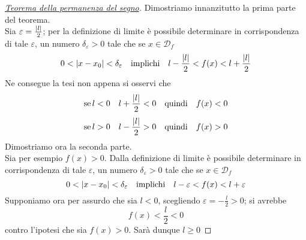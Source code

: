 \begin{proof}[\protect\hyperlink{teor:segno}{Teorema della permanenza del segno}]
  Dimostriamo innanzitutto la prima parte del teorema.\\
  Sia $\varepsilon=\frac{\lvert l\rvert}{2}$; per la definizione di limite è possibile determinare in 
  corrispondenza di tale $\varepsilon$, un numero $\delta_\varepsilon>0$ tale che se 
  $x\in\mathscr{D}_f$
  \begin{equation*}
    0<\lvert x-x_0\rvert<\delta_\varepsilon\quad\text{implichi}\quad
    l-\frac{\lvert l\rvert}{2}<f(x)<l+\frac{\lvert l\rvert}{2}
  \end{equation*}
  Ne consegue la tesi non appena si osservi che
  \begin{equation*}
    \text{se}\, l<0\quad l+\frac{\lvert l\rvert}{2}<0\quad\text{quindi}\quad f(x)<0
  \end{equation*}
  \begin{equation*}
    \text{se}\, l>0\quad l-\frac{\lvert l\rvert}{2}>0\quad\text{quindi}\quad f(x)>0
  \end{equation*}
  Dimostriamo ora la seconda parte.\\
  Sia per esempio $f(x)>0$. Dalla definizione di limite è possibile determinare in 
  corrispondenza di tale $\varepsilon$, un numero $\delta_\varepsilon>0$ tale che se 
  $x\in\mathscr{D}_f$
  \begin{equation*}
    0<\lvert x-x_0\rvert<\delta_\varepsilon\quad\text{implichi}\quad
    l-\varepsilon<f(x)<l+\varepsilon
  \end{equation*}
  Supponiamo ora per assurdo che sia $l<0$, scegliendo $\varepsilon=-\frac{l}{2}>0$; si avrebbe
  \begin{equation*}
    f(x)<\frac{l}{2}<0
  \end{equation*}
  contro l'ipotesi che sia $f(x)>0$. Sarà dunque $l\geq0$
\end{proof}

